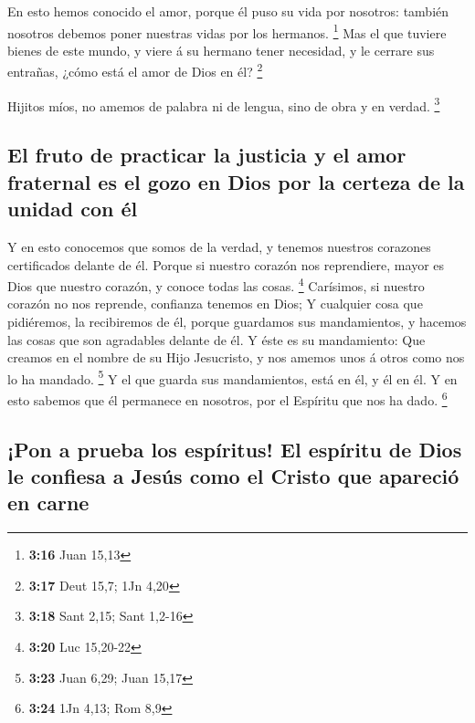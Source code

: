  En esto hemos conocido el amor, porque él puso su vida
por nosotros: también nosotros debemos poner nuestras vidas por los
hermanos. \footnote{\textbf{3:16} Juan 15,13}  Mas el que
tuviere bienes de este mundo, y viere á su hermano tener necesidad, y le
cerrare sus entrañas, ¿cómo está el amor de Dios en él? \footnote{\textbf{3:17}
  Deut 15,7; 1Jn 4,20}

 Hijitos míos, no amemos de palabra ni de lengua, sino de
obra y en verdad. \footnote{\textbf{3:18} Sant 2,15; Sant 1,2-16}

\hypertarget{el-fruto-de-practicar-la-justicia-y-el-amor-fraternal-es-el-gozo-en-dios-por-la-certeza-de-la-unidad-con-uxe9l}{%
\subsection{El fruto de practicar la justicia y el amor fraternal es el
gozo en Dios por la certeza de la unidad con
él}\label{el-fruto-de-practicar-la-justicia-y-el-amor-fraternal-es-el-gozo-en-dios-por-la-certeza-de-la-unidad-con-uxe9l}}

 Y en esto conocemos que somos de la verdad, y tenemos
nuestros corazones certificados delante de él.  Porque si
nuestro corazón nos reprendiere, mayor es Dios que nuestro corazón, y
conoce todas las cosas. \footnote{\textbf{3:20} Luc 15,20-22}
 Carísimos, si nuestro corazón no nos reprende, confianza
tenemos en Dios;  Y cualquier cosa que pidiéremos, la
recibiremos de él, porque guardamos sus mandamientos, y hacemos las
cosas que son agradables delante de él.  Y éste es su
mandamiento: Que creamos en el nombre de su Hijo Jesucristo, y nos
amemos unos á otros como nos lo ha mandado. \footnote{\textbf{3:23} Juan
  6,29; Juan 15,17}  Y el que guarda sus mandamientos,
está en él, y él en él. Y en esto sabemos que él permanece en nosotros,
por el Espíritu que nos ha dado. \footnote{\textbf{3:24} 1Jn 4,13; Rom
  8,9}

\hypertarget{pon-a-prueba-los-espuxedritus-el-espuxedritu-de-dios-le-confiesa-a-jesuxfas-como-el-cristo-que-apareciuxf3-en-carne}{%
\subsection{¡Pon a prueba los espíritus! El espíritu de Dios le confiesa
a Jesús como el Cristo que apareció en
carne}\label{pon-a-prueba-los-espuxedritus-el-espuxedritu-de-dios-le-confiesa-a-jesuxfas-como-el-cristo-que-apareciuxf3-en-carne}}

